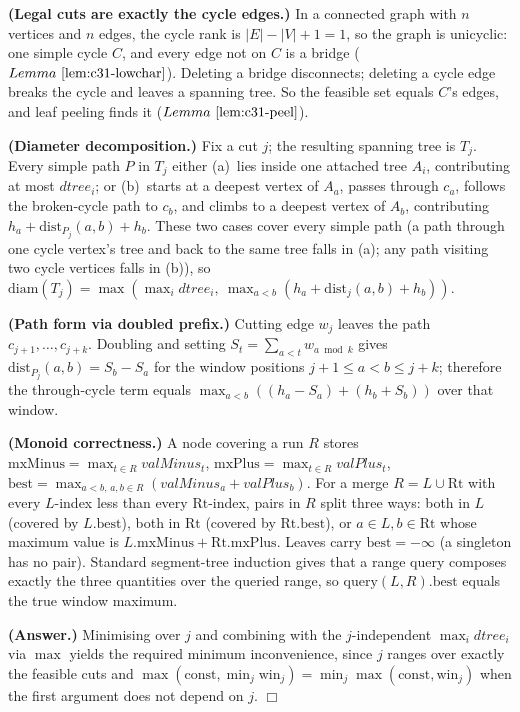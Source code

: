 \begin{proofbox}
\textbf{(Legal cuts are exactly the cycle edges.)}  In a connected graph with
\(n\) vertices and \(n\) edges, the cycle rank is \(|E|-|V|+{1}=1\), so the graph is
unicyclic: one simple cycle \(C\), and every edge not on \(C\) is a bridge
(\(\lemref{c31-lowchar}\)).  Deleting a bridge disconnects; deleting a cycle edge
breaks the cycle and leaves a spanning tree.  So the feasible set equals
\(C\)'s edges, and leaf peeling finds it (\(\lemref{c31-peel}\)).

\textbf{(Diameter decomposition.)}  Fix a cut \(j\); the resulting spanning tree
is \(T_j\).  Every simple path \(P\) in \(T_j\) either (a)~lies inside one attached
tree \(A_i\), contributing at most \(\mathit{dtree}_i\); or (b)~starts at a deepest
vertex of \(A_a\), passes through \(c_a\), follows the broken-cycle path to \(c_b\),
and climbs to a deepest vertex of \(A_b\), contributing
\(h_a+\mathrm{dist}_{P_j}(a,b)+h_b\).  These two cases cover every simple path
(a path through one cycle vertex's tree and back to the same tree falls in
(a); any path visiting two cycle vertices falls in (b)), so
\(\mathrm{diam}(T_j)=\max(\max_i\mathit{dtree}_i,\ \max_{a<b}(h_a+\mathrm{dist}_j(a,b)+h_b))\).

\textbf{(Path form via doubled prefix.)}  Cutting edge \(w_j\) leaves the path
\(c_{j+1},\ldots,c_{j+k}\).  Doubling and setting \(S_t=\sum_{a<t}w_{a\bmod k}\) gives
\(\mathrm{dist}_{P_j}(a,b)=S_b-S_a\) for the window positions
\(j+1\le a<b\le j+k\); therefore the through-cycle term equals
\(\max_{a<b}((h_a-S_a)+(h_b+S_b))\) over that window.

\textbf{(Monoid correctness.)}  A node covering a run \(R\) stores
\(\mathrm{mxMinus}=\max_{t\in R}\mathit{valMinus}_t\),
\(\mathrm{mxPlus}=\max_{t\in R}\mathit{valPlus}_t\),
\(\mathrm{best}=\max_{a<b,\,a,b\in R}(\mathit{valMinus}_a+\mathit{valPlus}_b)\).
For a merge \(R=L\cup\mathrm{Rt}\) with every \(L\)-index less than every
\(\mathrm{Rt}\)-index, pairs in \(R\) split three ways: both in \(L\) (covered by
\(L.\mathrm{best}\)), both in \(\mathrm{Rt}\) (covered by \(\mathrm{Rt}.\mathrm{best}\)),
or \(a\in L, b\in\mathrm{Rt}\) whose maximum value is
\(L.\mathrm{mxMinus}+\mathrm{Rt}.\mathrm{mxPlus}\).  Leaves carry
\(\mathrm{best}{=}-\infty\) (a singleton has no pair).  Standard segment-tree
induction gives that a range query composes exactly the three quantities over
the queried range, so \(\mathrm{query}(L,R).\mathrm{best}\) equals the true
window maximum.

\textbf{(Answer.)}  Minimising over \(j\) and combining with the \(j\)-independent
\(\max_i\mathit{dtree}_i\) via \(\max\) yields the required minimum inconvenience,
since \(j\) ranges over exactly the feasible cuts and
\(\max(\mathrm{const},\min_j\mathrm{win}_j)=\min_j\max(\mathrm{const},\mathrm{win}_j)\)
when the first argument does not depend on \(j\).  \(\Box\)
\end{proofbox}

